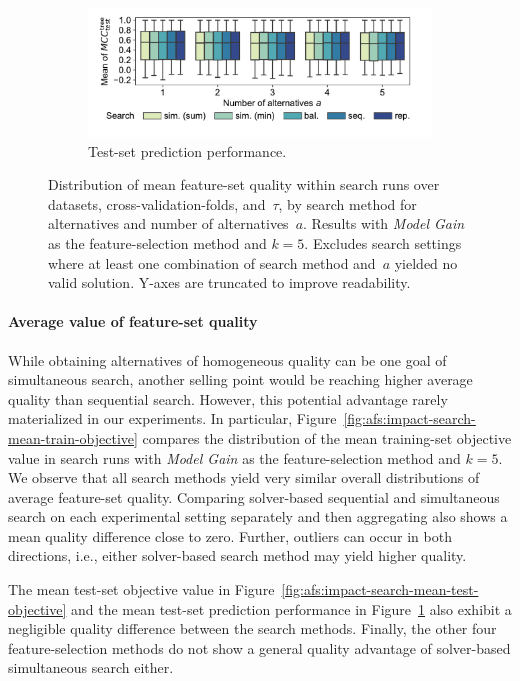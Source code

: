 \documentclass{article}
\theoremstyle{definition}
\begin{document}
\begin{figure}[p]
\begin{subfigure}[t]{\textwidth}
		\centering
		\includegraphics[width=\textwidth, trim=15 25 35 14, clip]{plots/afs-impact-search-mean-decision-tree-test-mcc.pdf}
		\caption{Test-set prediction performance.}
		\label{fig:afs:impact-search-mean-decision-tree-test-mcc}
	\end{subfigure}
	\caption{
		Distribution of mean feature-set quality within search runs over datasets, cross-validation-folds, and~$\tau$, by search method for alternatives and number of alternatives~$a$.
		Results with \emph{Model Gain} as the feature-selection method and $k=5$.
		Excludes search settings where at least one combination of search method and~$a$ yielded no valid solution.
		Y-axes are truncated to improve readability.
	}
	\label{fig:afs:impact-search-mean-quality}
\end{figure}

\paragraph{Average value of feature-set quality}

While obtaining alternatives of homogeneous quality can be one goal of simultaneous search, another selling point would be reaching higher average quality than sequential search.
However, this potential advantage rarely materialized in our experiments.
In particular, Figure~\ref{fig:afs:impact-search-mean-train-objective} compares the distribution of the mean training-set objective value in search runs with \emph{Model Gain} as the feature-selection method and $k=5$.
We observe that all search methods yield very similar overall distributions of average feature-set quality.
Comparing solver-based sequential and simultaneous search on each experimental setting separately and then aggregating also shows a mean quality difference close to zero.
Further, outliers can occur in both directions, i.e., either solver-based search method may yield higher quality.

The mean test-set objective value in Figure~\ref{fig:afs:impact-search-mean-test-objective} and the mean test-set prediction performance in Figure~\ref{fig:afs:impact-search-mean-decision-tree-test-mcc} also exhibit a negligible quality difference between the search methods.
Finally, the other four feature-selection methods do not show a general quality advantage of solver-based simultaneous search either.
\end{document}
